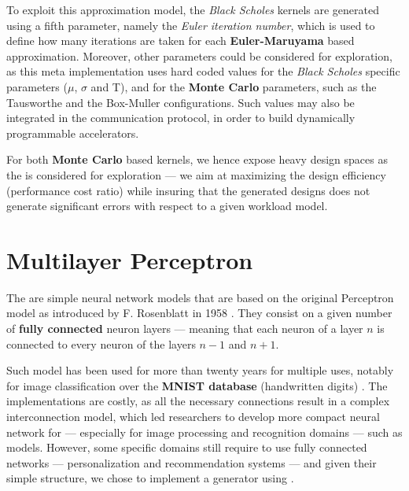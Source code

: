         To exploit this approximation model, the {\it Black Scholes} kernels are generated using a fifth parameter, namely the {\it Euler iteration number}, which is used to define how many iterations are taken for each {\bf Euler-Maruyama} based approximation.
        Moreover, other parameters could be considered for exploration, as this meta implementation uses hard coded values for the {\it Black Scholes} specific parameters ($\mu$, $\sigma$ and T), and for the {\bf Monte Carlo} parameters, such as the Tausworthe and the Box-Muller configurations.
        Such values may also be integrated in the communication protocol, in order to build dynamically programmable accelerators.

        For both {\bf Monte Carlo} based kernels, we hence expose heavy design spaces as the  is considered for exploration --- we aim at maximizing the design efficiency (\ie performance \vs cost ratio) while insuring that the generated designs does not generate significant errors with respect to a given workload model.

    \section*{Multilayer Perceptron}
        The  are simple neural network models that are based on the original Perceptron model as introduced by F. Rosenblatt in 1958 \cite{rosenblatt1958perceptron}.
        They consist on a given number of {\bf fully connected} neuron layers --- meaning that each neuron of a layer $n$ is connected to every neuron of the layers $n - 1$ and $n + 1$.
        
        Such model has been used for more than twenty years for multiple uses, notably for image classification over the {\bf MNIST database} (handwritten digits) \cite{lecun_gradient-based_1998}.
        The  implementations are costly, as all the necessary connections result in a complex interconnection model, which led researchers to develop more compact neural network for  --- especially for image processing and recognition domains --- such as  models.
        However, some specific domains still require to use fully connected networks --- \eg personalization and recommendation systems \cite{naumov2019deep} --- and given their simple structure, we chose to implement a  generator using \chisel.

